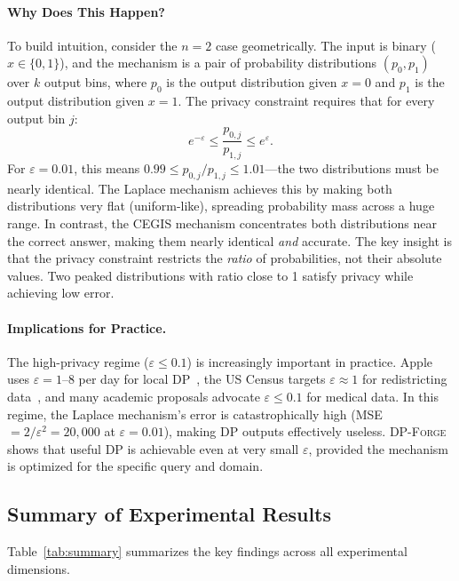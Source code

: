\documentclass[11pt,a4paper]{article}
\newcommand{\dpforge}{\textsc{DP-Forge}}
\newcommand{\eps}{\varepsilon}
\begin{document}
\paragraph{Why Does This Happen?}
To build intuition, consider the $n=2$ case geometrically.  The input is binary
($x \in \{0,1\}$), and the mechanism is a pair of probability distributions
$(p_0, p_1)$ over $k$ output bins, where $p_0$ is the output distribution given
$x=0$ and $p_1$ is the output distribution given $x=1$.  The privacy constraint
requires that for every output bin $j$:
\[
  e^{-\eps} \le \frac{p_{0,j}}{p_{1,j}} \le e^{\eps}.
\]
For $\eps = 0.01$, this means $0.99 \le p_{0,j}/p_{1,j} \le 1.01$---the two
distributions must be nearly identical.  The Laplace mechanism achieves this by
making both distributions very flat (uniform-like), spreading probability mass
across a huge range.  In contrast, the CEGIS mechanism concentrates both
distributions near the correct answer, making them nearly identical \emph{and}
accurate.  The key insight is that the privacy constraint restricts the
\emph{ratio} of probabilities, not their absolute values.  Two peaked
distributions with ratio close to 1 satisfy privacy while achieving low error.

\paragraph{Implications for Practice.}
The high-privacy regime ($\eps \le 0.1$) is increasingly important in practice.
Apple uses $\eps = 1$--$8$ per day for local DP~\cite{apple2017}, the US Census
targets $\eps \approx 1$ for redistricting data~\cite{abowd2018us}, and many
academic proposals advocate $\eps \le 0.1$ for medical data.  In this regime,
the Laplace mechanism's error is catastrophically high (MSE $= 2/\eps^2 = 20{,}000$
at $\eps = 0.01$), making DP outputs effectively useless.  \dpforge{} shows that
useful DP is achievable even at very small $\eps$, provided the mechanism is
optimized for the specific query and domain.

\subsection{Summary of Experimental Results}
\label{subsec:summary}

Table~\ref{tab:summary} summarizes the key findings across all experimental dimensions.
\end{document}
